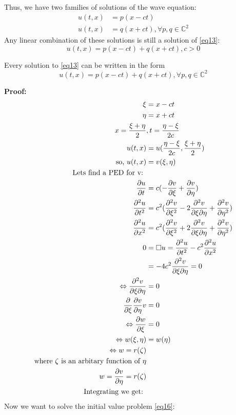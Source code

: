 Thus, we have two families of solutions of the wave equation:
\begin{align*}{}{}
u(t,x)&=p(x-ct)\\
u(t,x)&=q(x+ct), \forall p,q\in \mathbb{C}^2
\end{align*}
Any linear combination of these solutions is still a solution of \eqref{eq13}:
$$
    u(t,x)=p(x-ct)+q(x+ct),c>0
$$ 
\begin{theorem}[]{}
Every solution to \eqref{eq13} can be written in the form \begin{equation}
    \label{eq16} u(t,x)=p(x-ct)+q(x+ct), \forall p,q\in \mathbb{C}^2
\end{equation}
\end{theorem}
\textbf{Proof:}
\begin{align*}{}{}
    \xi &=x-ct\\
    \eta&=x+ct\\
    x=\frac{\xi+\eta}{2}&,t=\frac{\eta-\xi}{2c}\\
    u(t,x)&=u(\frac{\eta-\xi}{2c},\frac{\xi+\eta}{2})\\
    \text{so, }u(t,x)&=v(\xi,\eta)\\
    \text{Lets find a PED for v: }\\
    \pdv{u}{t}&=c(-\pdv{v}{\xi}+\pdv{v}{\eta})\\
    \pdv[2]{u}{t}&=c^2(\pdv[2]{v}{\xi}-2\pdv{v}{\xi}{\eta}+\pdv[2]{v}{\eta})\\
    \pdv[2]{u}{x}&=c^2(\pdv[2]{v}{\xi}+2\pdv{v}{\xi}{\eta}+\pdv[2]{v}{\eta})\\
    0&=\square u=\pdv[2]{u}{t}-c^2\pdv[2]{u}{x}\\
    &=-4c^2\pdv{v}{\xi}{\eta}=0\\
    \Leftrightarrow \pdv{v}{\xi}{\eta}&=0\\
    \frac{\partial}{\partial \xi}\frac{\partial v}{\partial \eta}v&=0\\
    \Leftrightarrow \frac{\partial w}{\partial \xi}&=0\\
    \Leftrightarrow w(\xi,\eta)&=w(\eta)\\
    \Leftrightarrow w=r(\zeta )\\
    \text{where } \zeta \text{ is an arbitary function of }\eta\\
    w=\pdv{v}{\eta}=r(\zeta )\\
    \text{Integrating we get: }\\
\end{align*}
Now we want to solve the initial value problem \eqref{eq16}:
